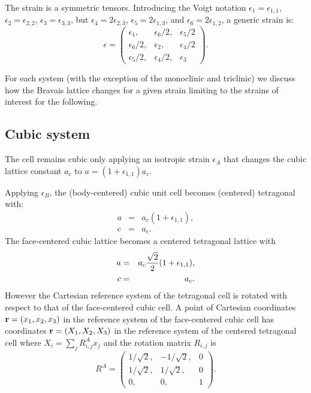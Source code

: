 \documentclass[12pt,a4paper,twoside]{report}
\begin{document}
The strain is a symmetric tensors. Introducing the Voigt notation 
$\epsilon_1=\epsilon_{1,1}$,
$\epsilon_2=\epsilon_{2,2}$, $\epsilon_3=\epsilon_{3,3}$, but
$\epsilon_4=2 \epsilon_{2,3}$, $\epsilon_5=2 \epsilon_{1,3}$, and
$\epsilon_6=2 \epsilon_{1,2}$, a generic strain is:
\begin{equation}
\epsilon=\left( \begin{array}{ccc}
\epsilon_1, & \epsilon_6/2, & \epsilon_5/2 
\\
\epsilon_6/2, & \epsilon_2, & \epsilon_4/2  
\\
\epsilon_5/2, & \epsilon_4/2, & \epsilon_{3}
\end{array}
\right).
\end{equation}

For each system (with the exception of the monoclinic and triclinic) 
we discuss how the Bravais lattice changes for a given strain limiting
to the strains of interest for the following.

{\color{web-blue}\subsection{Cubic system}}
\color{black}

The cell remains cubic only applying an isotropic strain $\epsilon_A$ that 
changes the cubic lattice constant $a_c$ to $a=(1+\epsilon_{1,1})a_c$.

Applying $\epsilon_B$, the (body-centered) cubic
unit cell becomes (centered) tetragonal with:
\begin{eqnarray}
a&=&a_c (1+\epsilon_{1,1}), \\
c&=&a_c.
\end{eqnarray}
The face-centered cubic lattice becomes a centered tetragonal lattice with
\begin{eqnarray}
a&=&a_c {\sqrt{2} \over 2} (1+\epsilon_{1,1}), \\
c&=&a_c.
\end{eqnarray}
However the Cartesian reference system of the tetragonal cell
is rotated with respect to that of the face-centered cubic cell. 
A point of Cartesian coordinates ${\bf r}=(x_1,x_2,x_3)$ 
in the reference system of the face-centered cubic cell 
has coordinates 
${\bf r}=(X_1,X_2,X_3)$ in the reference system of the centered tetragonal cell
where $X_i=\sum_j R^A_{i,j} x_j$ and the rotation matrix $R_{i,j}$ is 
\begin{equation}
R^A=\left( \begin{array}{ccc}
1/\sqrt{2}, & -1/\sqrt{2}, & 0 
\\
1/\sqrt{2}, & 1/\sqrt{2}, & 0 
\\
0, & 0, & 1
\end{array}
\right).
\end{equation}
\end{document}
